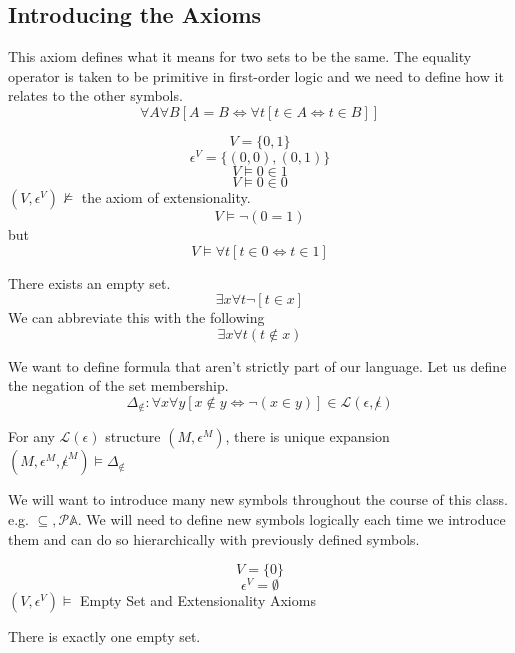 \subsection{Introducing the Axioms}
\begin{axiom}
     This axiom defines what it means for two sets to be the same. The equality operator is taken to be primitive in first-order logic and we need to define how it relates to the other symbols.
    \[\forall A \forall B [A = B \iff \forall t [t \in A \iff t \in B]]\]
\end{axiom}
\begin{ex}
\[V = \{0, 1\}\]
\[\epsilon^V = \{(0,0), (0, 1)\}\]
\[V \models 0 \in 1\]
\[V \models 0 \in 0\]
$(V, \epsilon^V) \not\models$ the axiom of extensionality.
\[V \models \neg(0 = 1)\]
but 
\[V \models \forall t [t \in 0 \iff t \in 1]\]
\end{ex}
\begin{axiom}
     There exists an empty set.
    \[\exists x \forall t \neg[t \in x]\]
    We can abbreviate this with the following
    \[\exists x \forall t (t \notin x)\]
\end{axiom}
\begin{defn}
    We want to define formula that aren't strictly part of our language. Let us define the negation of the set membership.
    \[\Delta_{\notin}: \forall x \forall y [x \notin y \iff \neg(x \in y)] \in \mathscr{L}(\epsilon, \not\epsilon)\]
\end{defn}
\begin{prop}
    For any $\mathscr{L}(\epsilon)$ structure $(M, \epsilon^M)$, there is unique expansion $(M, \epsilon^M, \not\epsilon^M) \models \Delta_{\notin}$
\end{prop}
\begin{rem} We will want to introduce many new symbols throughout the course of this class. e.g. $\subseteq, \mathcal{P} \mathbb{A}$. We will need to define new symbols logically each time we introduce them and can do so hierarchically with previously defined symbols.
\end{rem}
\begin{ex}
\[V = \{0\}\]
\[\epsilon^V = \emptyset\]
$(V, \epsilon^V) \models $ Empty Set and Extensionality Axioms
\end{ex}
\begin{prop}
There is exactly one empty set.
\end{prop}
